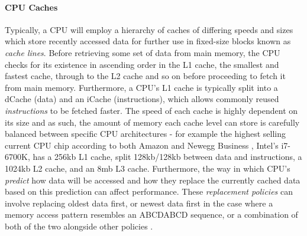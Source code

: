 \documentclass[10pt]{scrartcl}
\begin{document}
	\paragraph{CPU Caches} %
	\label{par:cpu_caches}
	Typically, a CPU will employ a hierarchy of caches of differing speeds and sizes which store recently accessed data for further use in fixed-size blocks known as \textit{cache lines}. Before retrieving some set of data from main memory, the CPU checks for its existence in ascending order in the L1 cache, the smallest and fastest cache, through to the L2 cache and so on before proceeding to fetch it from main memory. Furthermore, a CPU's L1 cache is typically split into a dCache (data) and an iCache (instructions), which allows commonly reused \textit{instructions} to be fetched faster. 
	The speed of each cache is highly dependent on its size and as such, the amount of memory each cache level can store is carefully balanced between specific CPU architectures - for example the highest selling current CPU chip according to both Amazon \parencite{amazon} and Newegg Business \parencite{newegg}, Intel's i7-6700K, has a 256kb L1 cache, split 128kb/128kb between data and instructions, a 1024kb L2 cache, and an 8mb L3 cache. Furthermore, the way in which CPU's \textit{predict} how data will be accessed and how they replace the currently cached data based on this prediction can affect performance. These \textit{replacement policies} can involve replacing oldest data first, or newest data first in the case where a memory access pattern resembles an ABCDABCD sequence, or a combination of both of the two alongside other policies \parencite{Al-Zoubi:2004:PEC:986537.986601}.
\end{document}
